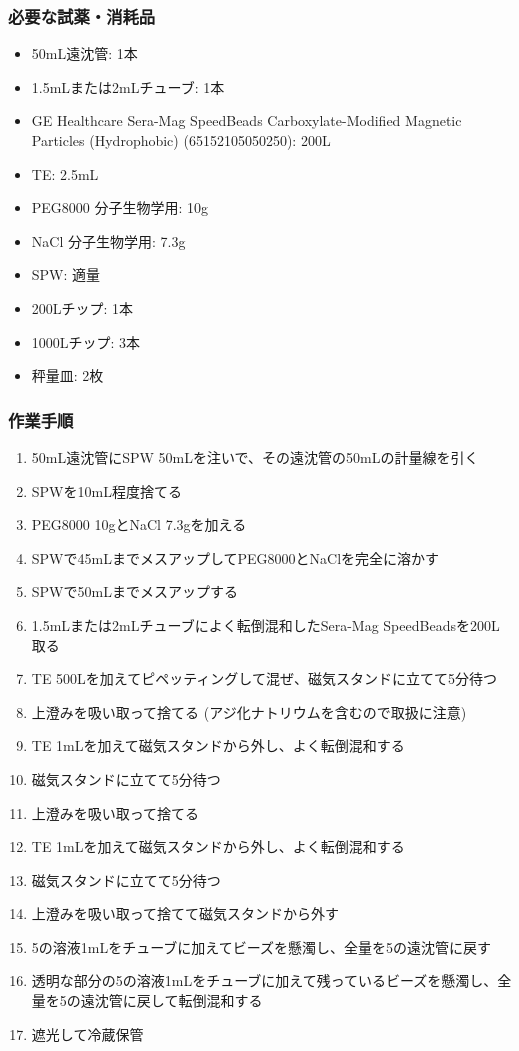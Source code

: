 \documentclass[titlepage,10pt,a4paper,uplatex]{jsbook}
\begin{document}
\subsubsection{必要な試薬・消耗品}
\begin{itemize}
\item 50mL遠沈管: 1本
\item 1.5mLまたは2mLチューブ: 1本
\item GE Healthcare Sera-Mag SpeedBeads Carboxylate-Modified Magnetic Particles (Hydrophobic) (65152105050250): 200{\textmu}L
\item TE: 2.5mL
\item PEG8000 分子生物学用: 10g
\item NaCl 分子生物学用: 7.3g
\item SPW: 適量
\item 200{\textmu}Lチップ: 1本
\item 1000{\textmu}Lチップ: 3本
\item 秤量皿: 2枚
\end{itemize}

\subsubsection{作業手順}
\begin{enumerate}
\item 50mL遠沈管にSPW 50mLを注いで、その遠沈管の50mLの計量線を引く
\item SPWを10mL程度捨てる
\item PEG8000 10gとNaCl 7.3gを加える
\item SPWで45mLまでメスアップしてPEG8000とNaClを完全に溶かす
\item SPWで50mLまでメスアップする
\item 1.5mLまたは2mLチューブによく転倒混和したSera-Mag SpeedBeadsを200{\textmu}L取る
\item TE 500{\textmu}Lを加えてピペッティングして混ぜ、磁気スタンドに立てて5分待つ
\item 上澄みを吸い取って捨てる (アジ化ナトリウムを含むので取扱に注意)
\item TE 1mLを加えて磁気スタンドから外し、よく転倒混和する
\item 磁気スタンドに立てて5分待つ
\item 上澄みを吸い取って捨てる
\item TE 1mLを加えて磁気スタンドから外し、よく転倒混和する
\item 磁気スタンドに立てて5分待つ
\item 上澄みを吸い取って捨てて磁気スタンドから外す
\item 5の溶液1mLをチューブに加えてビーズを懸濁し、全量を5の遠沈管に戻す
\item 透明な部分の5の溶液1mLをチューブに加えて残っているビーズを懸濁し、全量を5の遠沈管に戻して転倒混和する
\item 遮光して冷蔵保管
\end{enumerate}
\end{document}
